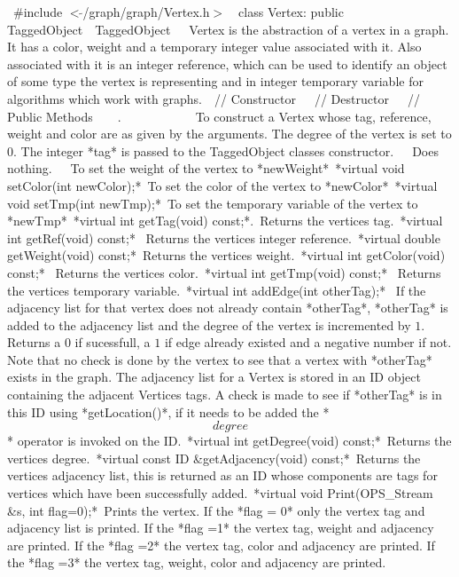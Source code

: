 \
\#include $<\tilde{ }$/graph/graph/Vertex.h$>$\
\
class Vertex: public TaggedObject\
\
TaggedObject\
\
\
Vertex is the abstraction of a vertex in a graph. It has a color, weight
and a temporary integer value associated with it. Also associated with
it is an integer reference, which can be used to identify an object of
some type the vertex is representing and in integer temporary variable
for algorithms which work with graphs.\
\
// Constructor\
\
\
// Destructor\
\
\
// Public Methods\
\
\
\
.\
\
\
\
\
\
\
\
\
\
\
\
To construct a Vertex whose tag, reference, weight and color are as
given by the arguments. The degree of the vertex is set to $0$. The
integer *tag* is passed to the TaggedObject classes constructor.\
\
\
Does nothing.\
\
\
To set the weight of the vertex to *newWeight*\
*virtual void setColor(int newColor);*\
To set the color of the vertex to *newColor*\
*virtual void setTmp(int newTmp);*\
To set the temporary variable of the vertex to *newTmp*\
*virtual int getTag(void) const;*.\
Returns the vertices tag.\
*virtual int getRef(void) const;* \
Returns the vertices integer reference.\
*virtual double getWeight(void) const;*\
Returns the vertices weight.\
*virtual int getColor(void) const;* \
Returns the vertices color.\
*virtual int getTmp(void) const;* \
Returns the vertices temporary variable.\
*virtual int addEdge(int otherTag);* \
If the adjacency list for that vertex does not already contain
*otherTag*, *otherTag* is added to the adjacency list and the degree of
the vertex is incremented by $1$. Returns a $0$ if sucessfull, a $1$ if
edge already existed and a negative number if not. Note that no check is
done by the vertex to see that a vertex with *otherTag* exists in the
graph. The adjacency list for a Vertex is stored in an ID object
containing the adjacent Vertices tags. A check is made to see if
*otherTag* is in this ID using *getLocation()*, if it needs to be added
the *\[degree\]* operator is invoked on the ID.\
*virtual int getDegree(void) const;*\
Returns the vertices degree.\
*virtual const ID &getAdjacency(void) const;*\
Returns the vertices adjacency list, this is returned as an ID whose
components are tags for vertices which have been successfully added.\
*virtual void Print(OPS_Stream &s, int flag=0);*\
Prints the vertex. If the *flag = 0* only the vertex tag and adjacency
list is printed. If the *flag =1* the vertex tag, weight and adjacency
are printed. If the *flag =2* the vertex tag, color and adjacency are
printed. If the *flag =3* the vertex tag, weight, color and adjacency
are printed.\
